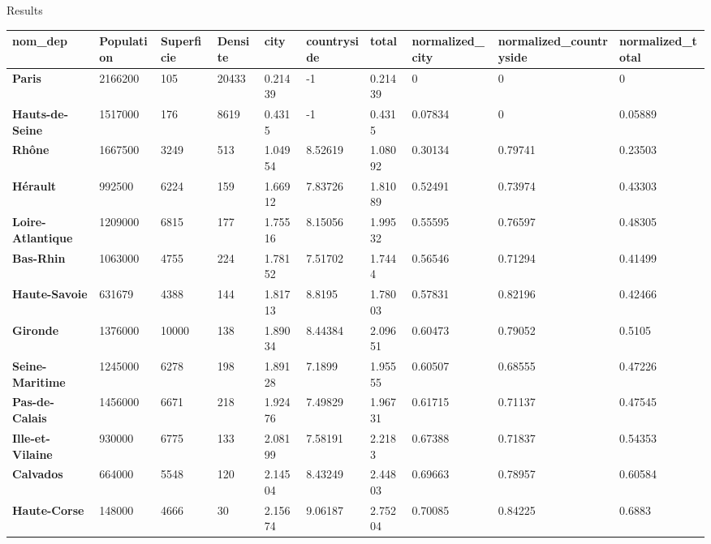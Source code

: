 \begin{frame}{Results}
    \begin{table}[!ht]
        \tiny
            \centering
            \begin{tabular}{l|lllllllll}
                \textbf{nom\_dep} & \textbf{Population} & \textbf{Superficie} & \textbf{Densite} & \textbf{city} & \textbf{countryside} & \textbf{total} & \textbf{normalized\_city} & \textbf{normalized\_countryside} & \textbf{normalized\_total} \\ \hline
                \textbf{Paris} & 2166200 & 105 & 20433 & 0.21439 & -1 & 0.21439 & 0 & 0 & 0 \\ 
                \textbf{Hauts-de-Seine} & 1517000 & 176 & 8619 & 0.4315 & -1 & 0.4315 & 0.07834 & 0 & 0.05889 \\ 
                
                \textbf{Rhône} & 1667500 & 3249 & 513 & 1.04954 & 8.52619 & 1.08092 & 0.30134 & 0.79741 & 0.23503 \\ 
                
                \textbf{Hérault} & 992500 & 6224 & 159 & 1.66912 & 7.83726 & 1.81089 & 0.52491 & 0.73974 & 0.43303 \\ 
                \textbf{Loire-Atlantique} & 1209000 & 6815 & 177 & 1.75516 & 8.15056 & 1.99532 & 0.55595 & 0.76597 & 0.48305 \\ 
                \textbf{Bas-Rhin} & 1063000 & 4755 & 224 & 1.78152 & 7.51702 & 1.7444 & 0.56546 & 0.71294 & 0.41499 \\ 
                \textbf{Haute-Savoie} & 631679 & 4388 & 144 & 1.81713 & 8.8195 & 1.78003 & 0.57831 & 0.82196 & 0.42466 \\ 
                
                \textbf{Gironde} & 1376000 & 10000 & 138 & 1.89034 & 8.44384 & 2.09651 & 0.60473 & 0.79052 & 0.5105 \\ 
                \textrm{\textbf{Seine-Maritime}} & 1245000 & 6278 & 198 & 1.89128 & 7.1899 & 1.95555 & 0.60507 & 0.68555 & 0.47226 \\ 
                \textbf{Pas-de-Calais} & 1456000 & 6671 & 218 & 1.92476 & 7.49829 & 1.96731 & 0.61715 & 0.71137 & 0.47545 \\ 
                
                \textbf{Ille-et-Vilaine} & 930000 & 6775 & 133 & 2.08199 & 7.58191 & 2.2183 & 0.67388 & 0.71837 & 0.54353 \\ 
                \textrm{\textbf{Calvados}} & 664000 & 5548 & 120 & 2.14504 & 8.43249 & 2.44803 & 0.69663 & 0.78957 & 0.60584 \\ 
                \textbf{Haute-Corse} & 148000 & 4666 & 30 & 2.15674 & 9.06187 & 2.75204 & 0.70085 & 0.84225 & 0.6883 \\ 
                

\end{tabular}
\end{table}
\end{frame}
